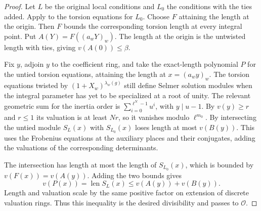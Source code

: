 \begin{proof}
Let $L$ be the original local conditions and $L_0$ the conditions with the ties added.
Apply  to the torsion equations for $L_0$. Choose $F$ attaining the length at the origin. Then $F$ bounds the corresponding torsion length at every integral point.
Put $A(Y)=F((a_wY)_w)$. The length at the origin is the untwisted length with ties, giving $v(A(0))\le\beta$.

Fix $y$, adjoin $y$ to the coefficient ring, and take the exact-length polynomial $P$ for the untied torsion equations, attaining the length at $x=(a_wy)_w$.
The torsion equations twisted by $(1+X_w)^{\lambda_w(g)}$ still define Selmer solution modules when the integral parameter has yet to be specialized at a root of unity.
The relevant geometric sum for the inertia order is $\sum_{i=0}^{\ell^N-1}u^i$, with $y\mid u-1$. By $v(y)\ge r$ and $r\le1$ its valuation is at least $Nr$, so it vanishes modulo $\ell^{m_0}$.
By  intersecting the untied module $S_L(x)$ with $S_{L_0}(x)$ loses length at most $v(B(y))$. This uses the Frobenius equations at the auxiliary places and their conjugates, adding the valuations of the corresponding determinants.

The intersection has length at most the length of $S_{L_0}(x)$, which is bounded by $v(F(x))=v(A(y))$.
Adding the two bounds gives
\[
 v(P(x))=\operatorname{len}S_L(x)\le v(A(y))+v(B(y)).
\]
Length and valuation scale by the same positive factor on extension of discrete valuation rings. Thus this inequality is the desired divisibility and passes to $\mathcal O$.
\end{proof}

